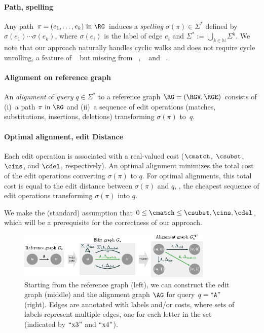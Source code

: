 \paragraph{Path, spelling}
Any path $\pi=(e_1,\dots,e_k) \text { in } \RG$ induces a \emph{spelling}
$\sigma(\pi) \in \Sigma^*$ defined by $\sigma(e_1)\cdots\sigma(e_k)$, where
$\sigma(e_i)$ is the label of edge $e_i$ and $\Sigma^* := \bigcup_{k \in
\mathbb{N}} \Sigma^k$. We note that our approach naturally handles cyclic walks
and does not require cycle unrolling, a feature of
\bitparallel~\cite{rautiainen_bitparallel_2019} but missing from
\vg~\cite{garrison_variation_2018}, \pasgal~\cite{jain_accelerating_2019} and
\valigntool~\cite{kavya_sequence_2019}.

\paragraph{Alignment on reference graph}
An \emph{alignment} of \emph{query} $q \in \Sigma^*$ to a reference graph
$\RG=(\RGV,\RGE)$ consists of (i)~a path $\pi \text{ in } \RG$ and (ii)~a
sequence of edit operations (matches, substitutions, insertions, deletions)
transforming $\sigma(\pi)$ to~$q$.

\paragraph{Optimal alignment, edit Distance}
Each edit operation is associated with a real-valued cost ($\cmatch$, $\csubst$,
$\cins$, and $\cdel$, respectively).
An optimal alignment minimizes the total cost of the edit operations converting
$\sigma(\pi)$ to $q$. For optimal alignments, this total cost is equal to the
edit distance between $\sigma(\pi)$ and $q$, \ie, the cheapest sequence of edit
operations transforming $\sigma(\pi)$ into $q$.

We make the (standard) assumption that $0 \leq \cmatch \leq \csubst, \cins,
\cdel$, which will be a prerequisite for the correctness of our approach.

\begin{figure}[t]
	\centering
	\includegraphics[width=0.8\columnwidth]{edit_graph}
	\caption[Constructing the alignment graph]{Starting from the reference graph
	(left), we can construct the edit graph (middle) and the alignment graph
	$\AG$ for query $q=``\texttt{A}"$ (right). Edges are annotated with labels
	and/or costs, where sets of labels represent multiple edges, one for each
	letter in the set (indicated by $``\text{x}3"$ and $``\text{x}4"$).}
	\label{TRIEfig:graph-constructions}
\end{figure}

